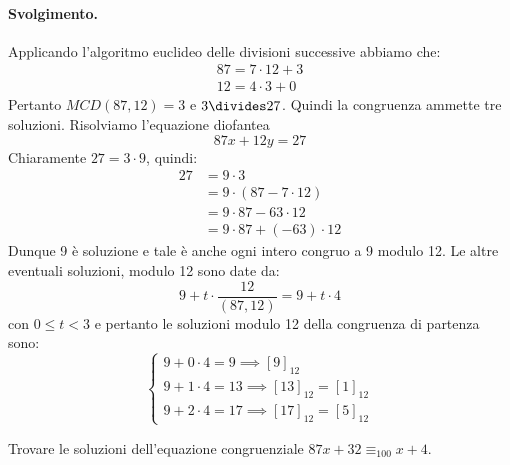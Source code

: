 \paragraph{Svolgimento.} Applicando l'algoritmo euclideo delle divisioni successive abbiamo che:
\begin{displaymath}
	\begin{array}{l}
		87 = 7 \cdot 12 + 3\\
		12 = 4 \cdot 3 + 0
	\end{array}
\end{displaymath}
Pertanto $MCD(87,12)=3$ e $3 \divides 27$. Quindi la congruenza ammette tre soluzioni. Risolviamo l'equazione diofantea $$87x+12y=27$$ Chiaramente $27 = 3 \cdot 9$, quindi:
\begin{align*}
	27 &= 9 \cdot 3 \\
	&= 9 \cdot (87 - 7 \cdot 12)\\
	&= 9 \cdot 87 - 63 \cdot 12\\
	&= 9 \cdot 87 + (-63) \cdot 12
\end{align*}
Dunque 9 è soluzione e tale è anche ogni intero congruo a 9 modulo 12. Le altre eventuali soluzioni, modulo 12 sono date da:
\begin{displaymath}
	9 + t \cdot \frac{12}{(87,12)} = 9+t \cdot 4
\end{displaymath}
con $0 \leq t < 3$ e pertanto le soluzioni modulo 12 della congruenza di partenza sono:
\begin{displaymath}
	\begin{cases}
		9 + 0 \cdot 4 = 9 \implies [9]_{12}\\
		9 + 1 \cdot 4 = 13 \implies [13]_{12} = [1]_{12}\\
		9 + 2 \cdot 4 = 17 \implies [17]_{12} = [5]_{12}
	\end{cases}
\end{displaymath}
\begin{flushright}
	\blacksquare
\end{flushright}

\begin{exsbox}
	Trovare le soluzioni dell'equazione congruenziale $87x+32 \equiv_{100} x+4$.
\end{exsbox}
